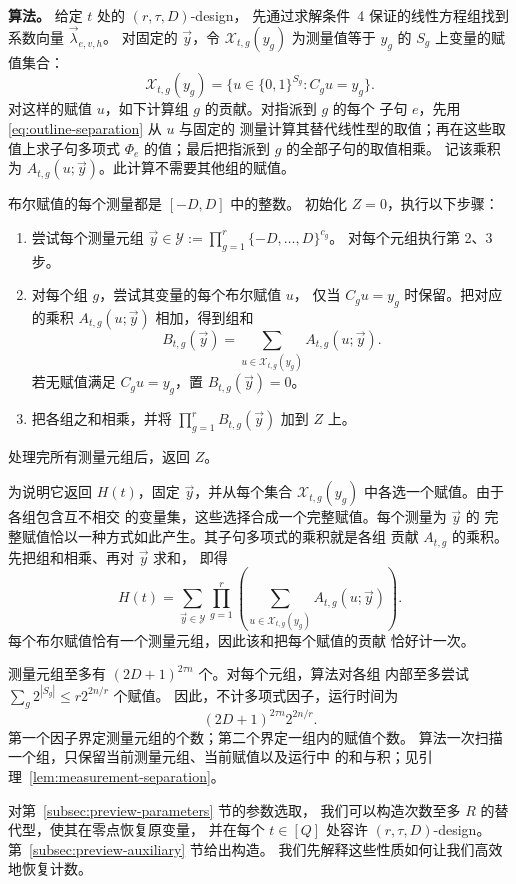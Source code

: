 \smallskip\noindent
\textbf{算法。}
给定 $t$ 处的 $(r,\tau,D)$-design，
先通过求解条件~4 保证的线性方程组找到系数向量
$\vec{\lambda}_{e,v,h}$。
对固定的 $\vec{y}$，令 $\mathcal X_{t,g}(y_g)$ 为测量值等于
$y_g$ 的 $S_g$ 上变量的赋值集合：
\[
 \mathcal X_{t,g}(y_g)
 =\{u\in\{0,1\}^{S_g}:C_gu=y_g\}.
\]
对这样的赋值 $u$，如下计算组 $g$ 的贡献。对指派到 $g$ 的每个
子句 $e$，先用 \eqref{eq:outline-separation} 从 $u$ 与固定的
测量计算其替代线性型的取值；再在这些取值上求子句多项式
$\Phi_e$ 的值；最后把指派到 $g$ 的全部子句的取值相乘。
记该乘积为 $A_{t,g}(u;\vec{y})$。此计算不需要其他组的赋值。

布尔赋值的每个测量都是 $[-D,D]$ 中的整数。
初始化 $Z=0$，执行以下步骤：
\begin{enumerate}
\item 尝试每个测量元组
$\vec{y}\in\mathcal Y:=\prod_{g=1}^r\{-D,\ldots,D\}^{c_g}$。
对每个元组执行第 2、3 步。
\item 对每个组 $g$，尝试其变量的每个布尔赋值 $u$，
仅当 $C_gu=y_g$ 时保留。把对应的乘积 $A_{t,g}(u;\vec{y})$
相加，得到组和
\[
 B_{t,g}(\vec{y})=
 \sum_{u\in\mathcal X_{t,g}(y_g)}A_{t,g}(u;\vec{y}).
\]
若无赋值满足 $C_gu=y_g$，置 $B_{t,g}(\vec{y})=0$。
\item 把各组之和相乘，并将 $\prod_{g=1}^r B_{t,g}(\vec{y})$
加到 $Z$ 上。
\end{enumerate}
处理完所有测量元组后，返回 $Z$。

为说明它返回 $H(t)$，固定 $\vec{y}$，并从每个集合
$\mathcal X_{t,g}(y_g)$ 中各选一个赋值。由于各组包含互不相交
的变量集，这些选择合成一个完整赋值。每个测量为 $\vec{y}$ 的
完整赋值恰以一种方式如此产生。其子句多项式的乘积就是各组
贡献 $A_{t,g}$ 的乘积。先把组和相乘、再对 $\vec{y}$ 求和，
即得
\begin{equation}\label{eq:outline-separated-sum}
 H(t)=\sum_{\vec{y}\in\mathcal Y}\prod_{g=1}^r
       \left(\sum_{u\in\mathcal X_{t,g}(y_g)}
                         A_{t,g}(u;\vec{y})\right).
\end{equation}
每个布尔赋值恰有一个测量元组，因此该和把每个赋值的贡献
恰好计一次。

测量元组至多有 $(2D+1)^{2\tau n}$ 个。对每个元组，算法对各组
内部至多尝试 $\sum_g2^{|S_g|}\le r2^{2n/r}$ 个赋值。
因此，不计多项式因子，运行时间为
\[
 (2D+1)^{2\tau n}2^{2n/r}.
\]
第一个因子界定测量元组的个数；第二个界定一组内的赋值个数。
算法一次扫描一个组，只保留当前测量元组、当前赋值以及运行中
的和与积；见引理~\ref{lem:measurement-separation}。

对第~\ref{subsec:preview-parameters} 节的参数选取，
我们可以构造次数至多 $R$ 的替代型，使其在零点恢复原变量，
并在每个 $t\in[Q]$ 处容许 $(r,\tau,D)$-design。
第~\ref{subsec:preview-auxiliary} 节给出构造。
我们先解释这些性质如何让我们高效地恢复计数。

